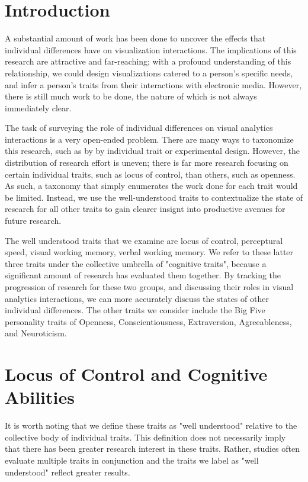 \documentclass[conference]{IEEEtran}
\begin{document}
\section{Introduction}\label{Intro}
A substantial amount of work has been done to uncover the
effects that individual differences have on visualization
interactions. The implications of this research are attractive
and far-reaching; with a profound understanding of this
relationship, we could design visualizations catered to a
person’s specific needs, and infer a person’s traits from
their interactions with electronic media.  However, there is
still much work to be done, the nature of which is not always
immediately clear. 

The task of surveying the role of individual differences on
visual analytics interactions is a very open-ended problem.
There are many ways to taxonomize this research, such as by
by individual trait or experimental design. However, the
distribution of research effort is uneven; there is
far more research focusing on certain individual traits,
such as locus of control, than others, such as openness.
As such, a taxonomy that simply enumerates the work done
for each trait would be limited. Instead, we use the
well-understood traits to contextualize the
state of research for all other traits
to gain clearer insignt into productive avenues for future
research.

The well understood traits that we examine are locus of control,
perceptural speed, visual working memory, verbal working
memory. We refer to these latter three traits under the
collective umbrella of "cognitive traits", because a significant
amount of research has evaluated them together. By tracking
the progression of research for these two groups, and discussing
their roles in visual analytics interactions, we can more
accurately discuss the states of other individual differences. 
The other traits we consider include the Big Five personality traits
of Openness, Conscientiousness, Extraversion, Agreeableness,
and Neuroticism.

\section{Locus of Control and Cognitive Abilities}\label{WellStudied}
It is worth noting that we define these traits as "well understood"
relative to the collective body of individual traits. This
definition does not necessarily imply that there has been greater
research interest in these traits. Rather, studies often evaluate
multiple traits in conjunction and the traits we label as
"well understood" reflect greater results.
\end{document}
